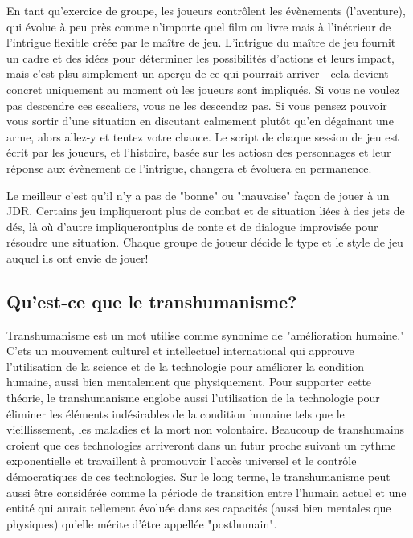 En tant qu'exercice de groupe, les joueurs contrôlent les évènements (l'aventure), qui évolue à peu près comme n'importe quel film ou livre mais à l'inétrieur de l'intrigue flexible créée par le maître de jeu. L'intrigue du maître de jeu fournit un cadre et des idées pour déterminer les possibilités d'actions et leurs impact, mais c'est plsu simplement un aperçu de ce qui pourrait arriver - cela devient concret uniquement au moment où les joueurs sont impliqués. Si vous ne voulez pas descendre ces escaliers, vous ne les descendez pas. Si vous pensez pouvoir vous sortir d'une situation en discutant calmement plutôt qu'en dégainant une arme, alors allez-y et tentez votre chance. Le script de chaque session de jeu est écrit par les joueurs, et l'histoire, basée sur les actiosn des personnages et leur réponse aux évènement de l'intrigue, changera et évoluera en permanence. 

Le meilleur c'est qu'il n'y a pas de "bonne" ou "mauvaise" façon de jouer à un JDR. Certains jeu impliqueront plus de combat et de situation liées à des jets de dés, là où d'autre impliquerontplus de conte et de dialogue improvisée pour résoudre une situation. Chaque groupe de joueur décide le type et le style de jeu auquel ils ont envie de jouer! 



\subsection{Qu'est-ce que le transhumanisme?} \label{sec:what-transhumanism} 

Transhumanisme est un mot utilise comme synonime de "amélioration humaine." C'ets un mouvement culturel et intellectuel international qui approuve l'utilisation de la science et de la technologie pour améliorer la condition humaine, aussi bien mentalement que physiquement. Pour supporter cette théorie, le transhumanisme englobe aussi l'utilisation de la technologie pour éliminer les éléments indésirables de la condition humaine tels que le vieillissement, les maladies et la mort non volontaire. Beaucoup de transhumains croient que ces technologies arriveront dans un futur proche suivant un rythme exponentielle et travaillent à promouvoir l'accès universel et le contrôle démocratiques de ces technologies. Sur le long terme, le transhumanisme peut aussi être considérée comme la période de transition entre l'humain actuel et une entité qui aurait tellement évoluée dans ses capacités (aussi bien mentales que physiques) qu'elle mérite d'être appellée "posthumain". 

